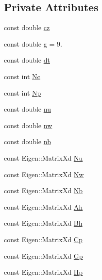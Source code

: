 \subsection*{\-Private \-Attributes}
\begin{DoxyCompactItemize}
\item 
const double \hyperlink{classZmpPreviewController_a3a317d26cc1bbaf8811491724fdd1def}{cz}
\item 
const double \hyperlink{classZmpPreviewController_a344571f012aa58250d7625905681bf1b}{g} = 9.
\item 
const double \hyperlink{classZmpPreviewController_abf1a3ec8d1698afab1c20bba32b5a724}{dt}
\item 
const int \hyperlink{classZmpPreviewController_af0c8b4aa92a6e3e95f80d81a8c91f693}{\-Nc}
\item 
const int \hyperlink{classZmpPreviewController_a2de373daf73b4c28f4b6387787bd27e2}{\-Np}
\item 
const double \hyperlink{classZmpPreviewController_ac611f084023404faba1ccfab573cd81d}{nu}
\item 
const double \hyperlink{classZmpPreviewController_a783427b817d77469e1f80426bede5310}{nw}
\item 
const double \hyperlink{classZmpPreviewController_a6716ee4c94e6f91e608ee1e29fbc7051}{nb}
\item 
const \-Eigen\-::\-Matrix\-Xd \hyperlink{classZmpPreviewController_ac3e92145988993ede7ce2060b997c8db}{\-Nu}
\item 
const \-Eigen\-::\-Matrix\-Xd \hyperlink{classZmpPreviewController_a5e85354a1a7c3f2a8e265dbe7367051c}{\-Nw}
\item 
const \-Eigen\-::\-Matrix\-Xd \hyperlink{classZmpPreviewController_abd345d397e99ae01ad4ea80cd9894802}{\-Nb}
\item 
const \-Eigen\-::\-Matrix\-Xd \hyperlink{classZmpPreviewController_a8ee8ec415e25374f4fa687f5a5a6b9df}{\-Ah}
\item 
const \-Eigen\-::\-Matrix\-Xd \hyperlink{classZmpPreviewController_a98bd07d03d0a6004b345ef4310cf17b6}{\-Bh}
\item 
const \-Eigen\-::\-Matrix\-Xd \hyperlink{classZmpPreviewController_a1a63870dcc3d51a26c4adc9c97e650ff}{\-Cp}
\item 
const \-Eigen\-::\-Matrix\-Xd \hyperlink{classZmpPreviewController_a53a7d8af5be4a5d5cea99fad2ea48979}{\-Gp}
\item 
const \-Eigen\-::\-Matrix\-Xd \hyperlink{classZmpPreviewController_a32ab17a3be30490e4a1e874bf3581843}{\-Hp}
\item 

\end{DoxyCompactItemize}
